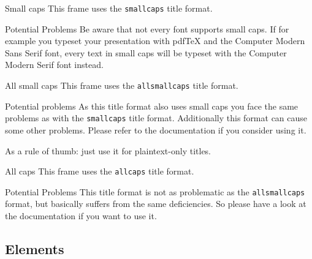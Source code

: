 	{
	\begin{frame}{Small caps}
		This frame uses the \texttt{smallcaps} title format.

		\begin{alertblock}{Potential Problems}
			Be aware that not every font supports small caps. If for example you typeset your presentation with pdfTeX and the Computer Modern Sans Serif font, every text in small caps will be typeset with the Computer Modern Serif font instead.
		\end{alertblock}
	\end{frame}
	}

	{
	\begin{frame}{All small caps}
		This frame uses the \texttt{allsmallcaps} title format.

		\begin{alertblock}{Potential problems}
			As this title format also uses small caps you face the same problems as with the \texttt{smallcaps} title format. Additionally this format can cause some other problems. Please refer to the documentation if you consider using it.

			As a rule of thumb: just use it for plaintext-only titles.
		\end{alertblock}
	\end{frame}
	}

	{
	\begin{frame}{All caps}
		This frame uses the \texttt{allcaps} title format.

		\begin{alertblock}{Potential Problems}
			This title format is not as problematic as the \texttt{allsmallcaps} format, but basically suffers from the same deficiencies. So please have a look at the documentation if you want to use it.
		\end{alertblock}
	\end{frame}
	}


\subsection{Elements}

